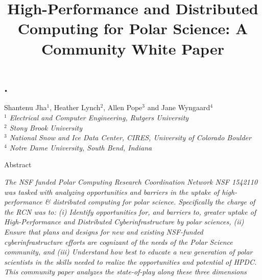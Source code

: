 \texttt{•}\documentclass[10pt,letterpaper,draft]{article}
\date{}
\begin{document}
\title{\bf High-Performance and Distributed Computing for Polar Science: A Community White Paper}

\maketitle

\vspace{-0.9in}





\renewcommand{\thepage}{\arabic{page}}


\thispagestyle{empty}
\begin{center} 

\vspace{0.25in}
\large Shantenu Jha$^{1}$,
       Heather Lynch$^{2}$,
       Allen Pope$^{3}$ and 
       Jane Wyngaard$^{4}$\\

\small {\it $^1$ Electrical and Computer Engineering, Rutgers University} \\
\small {\it $^2$ Stony Brook University} \\
\small {\it $^3$ National Snow and Ice Data Center, CIRES, University of Colorado Boulder} \\
\small {\it $^4$ Notre Dame University, South Bend, Indiana}

\vspace{0.25in}
\end{center} 
\begin{center}
	\large Abstract
\end{center}
{\it  The NSF funded Polar Computing Research Coordination Network NSF 1542110~\cite{polar-computing-github} was tasked with analyzing opportunities and barriers in the uptake of high-performance \& distributed computing for polar science. Specifically the charge of the RCN was to: (i) Identify opportunities for, and barriers to, greater uptake of High-Performance and Distributed Cyberinfrastructure by polar sciences, (ii) Ensure that plans and designs for new and existing NSF-funded cyberinfrastructure efforts are cognizant of the needs of the Polar Science community, and (iii) Understand how best to educate a new generation of polar scientists in the skills needed to realize the opportunities and potential of HPDC. This community paper analyzes the state-of-play along these three dimensions }
\end{document}
